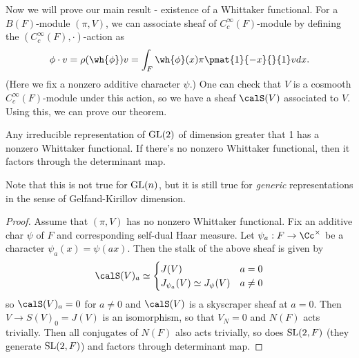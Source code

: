 Now we will prove our main result - existence of a Whittaker functional. 
For a $B(F)$-module $(\pi, V)$, we can associate sheaf of $C^{\infty}_{c}(F)$-module by defining the $(C_{c}^{\infty}(F), \cdot)$-action as
$$
\phi \cdot v = \rho(\wh{\phi})v = \int_F \wh{\phi}(x) \pi \pmat{1}{-x}{}{1} v dx. 
$$
(Here we fix a nonzero additive character $\psi$.) One can check that $V$ is a cosmooth $C_{c}^{\infty}(F)$-module under this action, so we have a sheaf $\calS(V)$ associated to $V$. Using this, we can prove our theorem. 
\begin{theorem}
\label{dim1}
Any irreducible representation of $\mathrm{GL}(2)$ of dimension greater that 1 has a nonzero Whittaker functional. If there's no nonzero Whittaker functional, then it factors through the determinant map. 
\end{theorem}
Note that this is not true for $\mathrm{GL}(n)$, but it is still true for \emph{generic} representations in the sense of Gelfand-Kirillov dimension. 


\begin{proof}
Assume that $(\pi, V)$ has no nonzero Whittaker functional. Fix an additive char $\psi$ of $F$ and corresponding self-dual Haar measure. Let $\psi_a:F\to \Cc^{\times}$ be a character $\psi_a(x)=\psi(ax)$. Then the stalk of the above sheaf is given by
 $$
\calS(V)_{a} \simeq \begin{cases} J(V) & a = 0 \\ J_{\psi_{a}}(V) \simeq J_{\psi}(V) & a\neq 0 \end{cases}
$$
so $\calS(V)_a = 0$ for $a\neq 0$ and $\calS(V)$  is a skyscraper sheaf at $a=0$. Then $V\to S(V)_0=J(V)$ is an isomorphism, so that $V_N=0$ and $N(F)$ acts trivially. Then all conjugates of $N(F)$ also acts trivially, so does $\mathrm{SL}(2, F)$ (they generate $\mathrm{SL}(2,F)$) and factors through determinant map. 
\end{proof}

